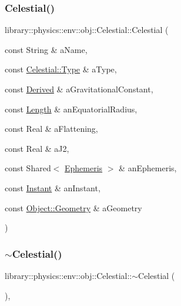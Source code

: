 \subsubsection{\texorpdfstring{Celestial()}{Celestial()}\hspace{0.1cm}{\footnotesize\ttfamily [2/2]}}
{\footnotesize\ttfamily library\+::physics\+::env\+::obj\+::\+Celestial\+::\+Celestial (\begin{DoxyParamCaption}\item[{const String \&}]{a\+Name,  }\item[{const \hyperlink{classlibrary_1_1physics_1_1env_1_1obj_1_1_celestial_aab1f58aa727e639288d65f3d33c4f245}{Celestial\+::\+Type} \&}]{a\+Type,  }\item[{const \hyperlink{classlibrary_1_1physics_1_1units_1_1_derived}{Derived} \&}]{a\+Gravitational\+Constant,  }\item[{const \hyperlink{classlibrary_1_1physics_1_1units_1_1_length}{Length} \&}]{an\+Equatorial\+Radius,  }\item[{const Real \&}]{a\+Flattening,  }\item[{const Real \&}]{a\+J2,  }\item[{const Shared$<$ \hyperlink{classlibrary_1_1physics_1_1env_1_1_ephemeris}{Ephemeris} $>$ \&}]{an\+Ephemeris,  }\item[{const \hyperlink{classlibrary_1_1physics_1_1time_1_1_instant}{Instant} \&}]{an\+Instant,  }\item[{const \hyperlink{classlibrary_1_1physics_1_1env_1_1_object_a750fd821b17667fec9e0a4eda23af048}{Object\+::\+Geometry} \&}]{a\+Geometry }\end{DoxyParamCaption})}

\mbox{\label{classlibrary_1_1physics_1_1env_1_1obj_1_1_celestial_a508a59c34ac23a582f2fed6003c4c907}} 
\subsubsection{\texorpdfstring{$\sim$\+Celestial()}{~Celestial()}}
{\footnotesize\ttfamily library\+::physics\+::env\+::obj\+::\+Celestial\+::$\sim$\+Celestial (\begin{DoxyParamCaption}{ }\end{DoxyParamCaption})\hspace{0.3cm}{\ttfamily [override]}, {\ttfamily [virtual]}}



